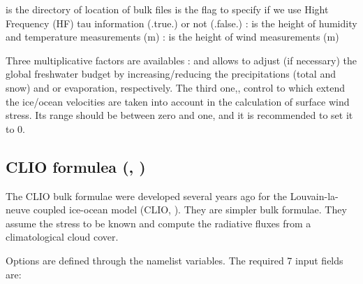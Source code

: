 \documentclass[../tex_main/NEMO_manual]{subfiles}
\begin{document}
 is the directory of location of bulk files
 is the flag to specify if we use Hight Frequency (HF) tau information (.true.) or not (.false.)
: is the height of humidity and temperature measurements (m)
: is the height of wind measurements (m)

Three multiplicative factors are availables : 
 and  allows to adjust (if necessary) the global freshwater budget 
by increasing/reducing the precipitations (total and snow) and or evaporation, respectively.
The third one,, control to which extend the ice/ocean velocities are taken into account 
in the calculation of surface wind stress. Its range should be between zero and one, 
and it is recommended to set it to 0.

\subsection{CLIO formulea (\protect{}, \protect{})}
\label{subsec:SBC_blk_clio}

The CLIO bulk formulae were developed several years ago for the 
Louvain-la-neuve coupled ice-ocean model (CLIO, \cite{Goosse_al_JGR99}). 
They are simpler bulk formulae. They assume the stress to be known and 
compute the radiative fluxes from a climatological cloud cover. 

Options are defined through the   namelist variables.
The required 7 input fields are:
\end{document}
